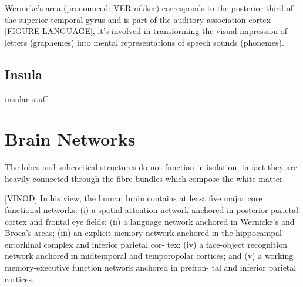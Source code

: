 Wernicke’s area (pronounced: VER-nikker) corresponds to the posterior third of the superior temporal gyrus and is part of the auditory association cortex [FIGURE LANGUAGE], it's involved in transforming the visual impression of letters (graphemes) into mental representations of speech sounds (phonemes).

\subsection{Insula}

insular stuff


\section{Brain Networks}

The lobes and subcortical structures do not function in isolation, in fact they are heavily connected through the fibre bundles which compose the white matter.

[VINOD]
In his view, the human brain contains at least five major core functional networks: (i) a spatial attention network anchored in posterior parietal cortex and frontal eye fields;
(ii) a language network anchored in Wernicke’s and Broca’s areas; (iii) an explicit memory network anchored in the hippocampal–entorhinal complex and inferior parietal cor- tex; (iv) a face-object recognition network anchored in
midtemporal and temporopolar cortices; and (v) a working memory-executive function network anchored in prefron- tal and inferior parietal cortices. 



